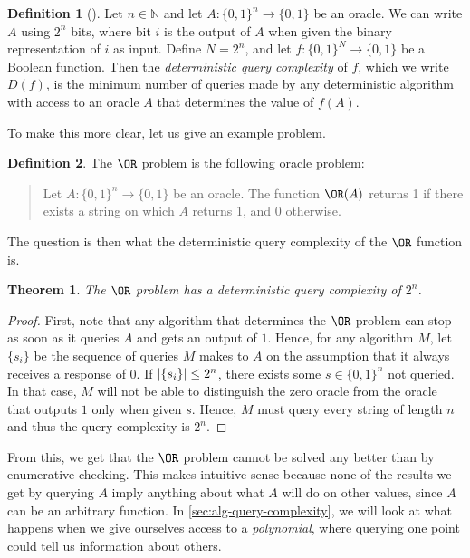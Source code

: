\documentclass[english,12pt]{reedthesis}
\theoremstyle{plain}
\newtheorem{thm}{Theorem}[section]
\theoremstyle{definition}
\newtheorem{defn}[defn]{Definition}
\theoremstyle{remark}
\DeclarePairedDelimiter{\abs}{\lvert}{\rvert}
\begin{document}
\begin{defn}[{\cite[17]{AW09}}]\label{def:det-qc}
  Let $n \in \mathbb{N}$ and let $A\colon \{0, 1\}^{n} \rightarrow \{0, 1\}$ be an oracle. We can write
  $A$ using $2^{n}$ bits, where bit $i$ is the output of $A$ when given the
  binary representation of $i$ as input. Define $N = 2^{n}$, and let
  $f\colon \{0, 1\}^{N} \rightarrow \{0, 1\}$ be a Boolean function. Then the
  \emph{deterministic query complexity} of $f$, which we write $D(f)$, is the
  minimum number of queries made by any deterministic algorithm with access to
  an oracle $A$ that determines the value of $f(A)$.
\end{defn}

To make this more clear, let us give an example problem.

\begin{defn}\label{def:or-problem}
  The $\OR$ problem is the following oracle problem:
  \begin{quote}
    Let $A\colon \{0, 1\}^{n} \rightarrow \{0, 1\}$ be an oracle. The function $\OR(A)$
    returns 1 if there exists a string on which $A$ returns 1, and $0$
    otherwise.
  \end{quote}
\end{defn}

The question is then what the deterministic query complexity of the $\OR$
function is.

\begin{thm}
  The $\OR$ problem has a deterministic query complexity of $2^{n}$.
\end{thm}

\begin{proof}
  First, note that any algorithm that determines the $\OR$ problem can stop as
  soon as it queries $A$ and gets an output of $1$. Hence, for any algorithm
  $M$, let $\{s_{i}\}$ be the sequence of queries $M$ makes to $A$ on the
  assumption that it always receives a response of $0$. If
  $\abs{\{s_{i}\}} \le 2^{n}$, there exists some $s \in \{0, 1\}^{n}$ not queried.
  In that case, $M$ will not be able to distinguish the zero oracle from the
  oracle that outputs $1$ only when given $s$. Hence, $M$ must query every
  string of length $n$ and thus the query complexity is $2^{n}$.
\end{proof}

From this, we get that the $\OR$ problem cannot be solved any better than by
enumerative checking. This makes intuitive sense because none of the results we
get by querying $A$ imply anything about what $A$ will do on other values, since
$A$ can be an arbitrary function. In \cref{sec:alg-query-complexity}, we will
look at what happens when we give ourselves access to a \emph{polynomial}, where
querying one point could tell us information about others.
\end{document}
